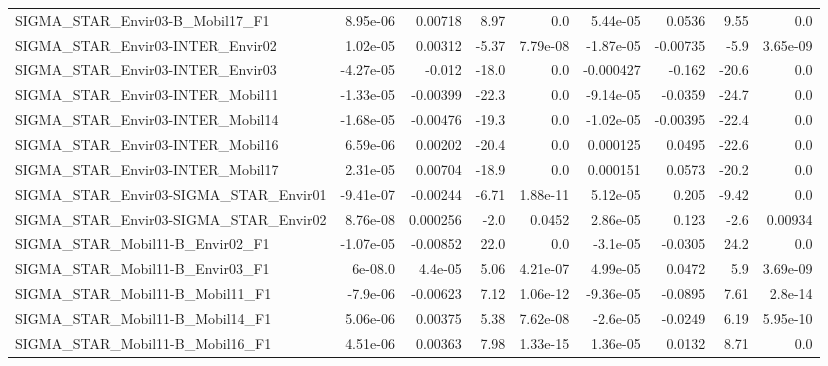 \begin{tabular}{lrrrrrrrr}
SIGMA\_STAR\_Envir03-B\_Mobil17\_F1           &    8.95e-06 &      0.00718 &    8.97 &      0.0 &   5.44e-05 &      0.0536 &         9.55 &           0.0 \\
SIGMA\_STAR\_Envir03-INTER\_Envir02          &    1.02e-05 &      0.00312 &   -5.37 & 7.79e-08 &  -1.87e-05 &    -0.00735 &         -5.9 &      3.65e-09 \\
SIGMA\_STAR\_Envir03-INTER\_Envir03          &   -4.27e-05 &       -0.012 &   -18.0 &      0.0 &  -0.000427 &      -0.162 &        -20.6 &           0.0 \\
SIGMA\_STAR\_Envir03-INTER\_Mobil11          &   -1.33e-05 &     -0.00399 &   -22.3 &      0.0 &  -9.14e-05 &     -0.0359 &        -24.7 &           0.0 \\
SIGMA\_STAR\_Envir03-INTER\_Mobil14          &   -1.68e-05 &     -0.00476 &   -19.3 &      0.0 &  -1.02e-05 &    -0.00395 &        -22.4 &           0.0 \\
SIGMA\_STAR\_Envir03-INTER\_Mobil16          &    6.59e-06 &      0.00202 &   -20.4 &      0.0 &   0.000125 &      0.0495 &        -22.6 &           0.0 \\
SIGMA\_STAR\_Envir03-INTER\_Mobil17          &    2.31e-05 &      0.00704 &   -18.9 &      0.0 &   0.000151 &      0.0573 &        -20.2 &           0.0 \\
SIGMA\_STAR\_Envir03-SIGMA\_STAR\_Envir01     &   -9.41e-07 &     -0.00244 &   -6.71 & 1.88e-11 &   5.12e-05 &       0.205 &        -9.42 &           0.0 \\
SIGMA\_STAR\_Envir03-SIGMA\_STAR\_Envir02     &    8.76e-08 &     0.000256 &    -2.0 &   0.0452 &   2.86e-05 &       0.123 &         -2.6 &       0.00934 \\
SIGMA\_STAR\_Mobil11-B\_Envir02\_F1           &   -1.07e-05 &     -0.00852 &    22.0 &      0.0 &   -3.1e-05 &     -0.0305 &         24.2 &           0.0 \\
SIGMA\_STAR\_Mobil11-B\_Envir03\_F1           &     6e-08.0 &      4.4e-05 &    5.06 & 4.21e-07 &   4.99e-05 &      0.0472 &          5.9 &      3.69e-09 \\
SIGMA\_STAR\_Mobil11-B\_Mobil11\_F1           &    -7.9e-06 &     -0.00623 &    7.12 & 1.06e-12 &  -9.36e-05 &     -0.0895 &         7.61 &       2.8e-14 \\
SIGMA\_STAR\_Mobil11-B\_Mobil14\_F1           &    5.06e-06 &      0.00375 &    5.38 & 7.62e-08 &   -2.6e-05 &     -0.0249 &         6.19 &      5.95e-10 \\
SIGMA\_STAR\_Mobil11-B\_Mobil16\_F1           &    4.51e-06 &      0.00363 &    7.98 & 1.33e-15 &   1.36e-05 &      0.0132 &         8.71 &           0.0 \\

\end{tabular}
